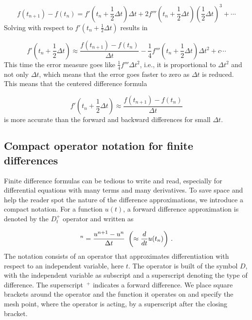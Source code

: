 \documentclass[%
oneside,                 %
final,                   %
10pt]{article}
\begin{document}
\begin{equation}
f(t_{n+1}) - f(t_n) = f'(t_n+\frac{1}{2}\Delta t)\Delta t
+ 2f'''(t_n+\frac{1}{2}\Delta t)(\frac{1}{2}\Delta t)^3 + \cdots
\label{decay:taylor:CN2}
\end{equation}
Solving with respect to $f'(t_n+\frac{1}{2}\Delta t)$ results
in

\begin{equation}
f'(t_n+\frac{1}{2}\Delta t) \approx \frac{f(t_{n+1}) - f(t_n)}{\Delta t}
- \frac{1}{4}f'''(t_n+\frac{1}{2}\Delta t)\Delta t^2 + c
\cdots
\label{decay:taylor:CN3}
\end{equation}
This time the error measure goes like $\frac{1}{4}f'''\Delta t^2$, i.e.,
it is proportional to $\Delta t^2$ and not only $\Delta t$, which means
that the error goes faster to zero as $\Delta t$ is reduced.
This means that the centered difference formula

\begin{equation}
f'(t_n+\frac{1}{2}\Delta t) \approx \frac{f(t_{n+1}) - f(t_n)}{\Delta t}
\label{decay:taylor:CN4}
\end{equation}
is more accurate than the forward and backward differences for small
$\Delta t$.


\subsection{Compact operator notation for finite differences}
\label{decay:fd:op}

 

Finite difference formulas can be tedious to write and read,
especially for differential equations with many terms and many
derivatives. To save space and help the reader spot
the nature of the difference approximations, we introduce a
compact notation. For a function $u(t)$,
a forward difference approximation is denoted
by the $D_t^+$ operator and written as

\begin{equation}
[D_t^+u]^n = \frac{u^{n+1} - u^{n}}{\Delta t}
\ \left( \approx \frac{d}{dt} u(t_n)\right) \label{fd:D:f}
\tp
\end{equation}
The notation consists of an operator that approximates
differentiation with respect to an independent variable, here $t$.
The operator is built of the symbol $D$, with the
independent variable as subscript
and a superscript denoting the type of difference. The superscript $\,{}^+$
indicates a forward difference.
We place square brackets around the operator and the function it operates
on and specify the mesh point, where the operator is acting, by
a superscript after the closing bracket.
\end{document}
